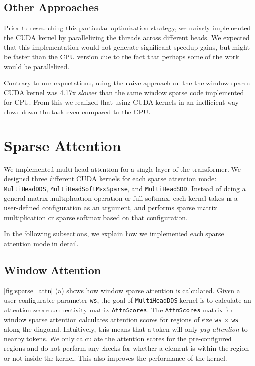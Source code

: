 \documentclass[11pt]{article}
\begin{document}
\subsection{Other Approaches}
Prior to researching this particular optimization strategy, we naively implemented the CUDA kernel by parallelizing the threads across different heads.
We expected that this implementation would not generate significant speedup gains, but might be faster than the CPU version due to the fact that perhaps some of the work would be parallelized.

Contrary to our expectations, using the naive approach on the the window sparse CUDA kernel was 4.17x \textit{slower} than the same window sparse code implemented for CPU. 
From this we realized that using CUDA kernels in an inefficient way slows down the task even compared to the CPU.

\section{Sparse Attention}\label{sec:sparse}
We implemented multi-head attention for a single layer of the transformer. We designed three different CUDA kernels for each sparse attention mode: \texttt{MultiHeadDDS}, \texttt{MultiHeadSoftMaxSparse}, and \texttt{MultiHeadSDD}. Instead of doing a general matrix multiplication operation or full softmax, each kernel takes in a user-defined configuration as an argument, and performs sparse matrix multiplication or sparse softmax based on that configuration.

In the following subsections, we explain how we implemented each sparse attention mode in detail.



\subsection{Window Attention}
\autoref{fig:sparse_attn} (a) shows how window sparse attention is calculated. Given a user-configurable parameter \texttt{ws}, the goal of \texttt{MultiHeadDDS} kernel is to calculate an attention score connectivity matrix \texttt{AttnScores}. The \texttt{AttnScores} matrix for window sparse attention calculates attention scores for regions of size \texttt{ws} $\times$ \texttt{ws} along the diagonal. Intuitively, this means that a token will only \textit{pay attention} to nearby tokens. We only calculate the attention scores for the pre-configured regions and do not perform any checks for whether a element is within the region or not inside the kernel. This also improves the performance of the kernel.
\end{document}
